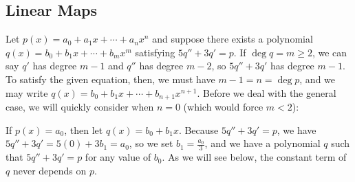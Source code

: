 \subsection{Linear Maps}


\begin{coole}
    Let $p(x) = a_0 + a_1x + \cdots + a_nx^n$ and suppose there exists a polynomial $q(x) = b_0 + b_1x + \cdots + b_mx^m$ satisfying $5q'' + 3q' = p$. 
    If $\deg q = m \geq 2$, we can say $q'$ has degree $m-1$ and $q''$ has degree $m-2$, so $5q'' + 3q'$ has degree $m-1$.
    To satisfy the given equation, then, we must have $m-1 = n = \deg p$, and we may write $q(x) = b_0 + b_1x + \cdots + b_{n+1}x^{n+1}$.
    Before we deal with the general case, we will quickly consider when $n = 0$ (which would force $m < 2$):

    If $p(x) = a_0$, then let $q(x) = b_0 + b_1x$. Because $5q'' + 3q' = p$, we have $5q'' + 3q' = 5(0) + 3b_1 = a_0$, so we set $b_1 = \frac{a_0}{3}$, and we have a polynomial $q$ such that $5q'' + 3q' = p$ for any value of $b_0$.
    As we will see below, the constant term of $q$ never depends on $p$.
    

\end{coole}
